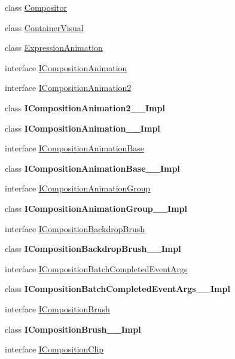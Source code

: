 \begin{DoxyCompactItemize}
\item 
class \hyperlink{class_windows_1_1_u_i_1_1_composition_1_1_compositor}{Compositor}
\item 
class \hyperlink{class_windows_1_1_u_i_1_1_composition_1_1_container_visual}{Container\+Visual}
\item 
class \hyperlink{class_windows_1_1_u_i_1_1_composition_1_1_expression_animation}{Expression\+Animation}
\item 
interface \hyperlink{interface_windows_1_1_u_i_1_1_composition_1_1_i_composition_animation}{I\+Composition\+Animation}
\item 
interface \hyperlink{interface_windows_1_1_u_i_1_1_composition_1_1_i_composition_animation2}{I\+Composition\+Animation2}
\item 
class {\bfseries I\+Composition\+Animation2\+\_\+\+\_\+\+Impl}
\item 
class {\bfseries I\+Composition\+Animation\+\_\+\+\_\+\+Impl}
\item 
interface \hyperlink{interface_windows_1_1_u_i_1_1_composition_1_1_i_composition_animation_base}{I\+Composition\+Animation\+Base}
\item 
class {\bfseries I\+Composition\+Animation\+Base\+\_\+\+\_\+\+Impl}
\item 
interface \hyperlink{interface_windows_1_1_u_i_1_1_composition_1_1_i_composition_animation_group}{I\+Composition\+Animation\+Group}
\item 
class {\bfseries I\+Composition\+Animation\+Group\+\_\+\+\_\+\+Impl}
\item 
interface \hyperlink{interface_windows_1_1_u_i_1_1_composition_1_1_i_composition_backdrop_brush}{I\+Composition\+Backdrop\+Brush}
\item 
class {\bfseries I\+Composition\+Backdrop\+Brush\+\_\+\+\_\+\+Impl}
\item 
interface \hyperlink{interface_windows_1_1_u_i_1_1_composition_1_1_i_composition_batch_completed_event_args}{I\+Composition\+Batch\+Completed\+Event\+Args}
\item 
class {\bfseries I\+Composition\+Batch\+Completed\+Event\+Args\+\_\+\+\_\+\+Impl}
\item 
interface \hyperlink{interface_windows_1_1_u_i_1_1_composition_1_1_i_composition_brush}{I\+Composition\+Brush}
\item 
class {\bfseries I\+Composition\+Brush\+\_\+\+\_\+\+Impl}
\item 
interface \hyperlink{interface_windows_1_1_u_i_1_1_composition_1_1_i_composition_clip}{I\+Composition\+Clip}

\end{DoxyCompactItemize}
